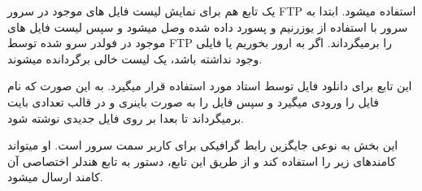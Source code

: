 یک تابع هم برای نمایش لیست فایل های موجود در سرور FTP استفاده میشود. ابتدا به سرور با استفاده از یوزرنیم و پسورد داده شده وصل میشود و سپس لیست فایل های موجود در فولدر سرو شده توسط FTP را برمیگرداند. اگر به ارور بخوریم یا فایلی وجود نداشته باشد، یک لیست خالی برگردانده میشوند.


{
}

این تابع برای دانلود فایل توسط استاد مورد استفاده قرار میگیرد. به این صورت که نام فایل را ورودی میگیرد و سپس فایل را به صورت باینری و در قالب تعدادی بایت برمیگرداند تا بعدا بر روی فایل جدیدی نوشته شود.

{
}


\pagebreak


این بخش به نوعی جایگزین رابط گرافیکی برای کاربر سمت سرور است. او میتواند کامندهای زیر 
را استفاده کند و از طریق این تابع، دستور به تابع هندلر اختصاصی آن کامند ارسال میشود.


{
}


